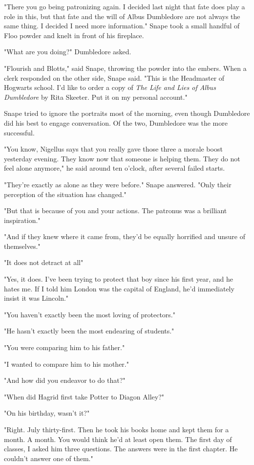 "There you go being patronizing again. I decided last night that fate does play a role in this, but that fate and the will of Albus Dumbledore are not always the same thing. I decided I need more information." Snape took a small handful of Floo powder and knelt in front of his fireplace.

"What are you doing?" Dumbledore asked.

"Flourish and Blotts," said Snape, throwing the powder into the embers. When a clerk responded on the other side, Snape said. "This is the Headmaster of Hogwarts school. I'd like to order a copy of \emph{The Life and Lies of Albus Dumbledore} by Rita Skeeter. Put it on my personal account."

Snape tried to ignore the portraits most of the morning, even though Dumbledore did his best to engage conversation. Of the two, Dumbledore was the more successful.

"You know, Nigellus says that you really gave those three a morale boost yesterday evening. They know now that someone is helping them. They do not feel alone anymore," he said around ten o'clock, after several failed starts.

"They're exactly as alone as they were before." Snape answered. "Only their perception of the situation has changed."

"But that is because of you and your actions. The patronus was a brilliant inspiration."

"And if they knew where it came from, they'd be equally horrified and unsure of themselves."

"It does not detract at all{\el}"

"Yes, it does. I've been trying to protect that boy since his first year, and he hates me. If I told him London was the capital of England, he'd immediately insist it was Lincoln."

"You haven't exactly been the most loving of protectors."

"He hasn't exactly been the most endearing of students."

"You were comparing him to his father."

"I wanted to compare him to his mother."

"And how did you endeavor to do that?"

"When did Hagrid first take Potter to Diagon Alley?"

"On his birthday, wasn't it?"

"Right. July thirty-first. Then he took his books home and kept them for a month. A month. You would think he'd at least open them. The first day of classes, I asked him three questions. The answers were in the first chapter. He couldn't answer one of them."

